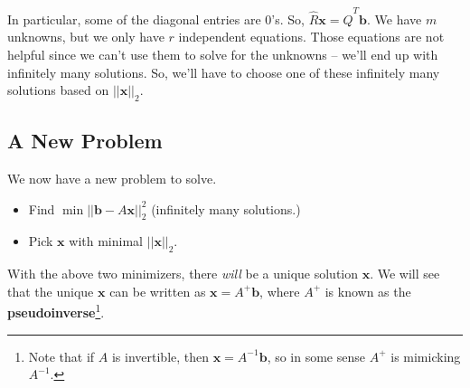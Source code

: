 \documentclass[letterpaper]{article}
\newcommand{\0}{\mathbf{0}}
\renewcommand{\b}{\mathbf{b}}
\newcommand{\x}{\mathbf{x}}
\begin{document}
In particular, some of the diagonal entries are 0's. So, $\hat{R}\x = \hat{Q}^T \b$. We have $m$ unknowns, but we only have $r$ independent equations. Those equations are not helpful since we can't use them to solve for the unknowns -- we'll end up with infinitely many solutions. So, we'll have to choose one of these infinitely many solutions based on $||\x||_2$. 

\subsection{A New Problem}
We now have a new problem to solve. 
\begin{itemize}
    \item Find $\min||\b - A\x||_2^2$ (infinitely many solutions.)
    \item Pick $\x$ with minimal $||\x||_2$. 
\end{itemize}
With the above two minimizers, there \emph{will} be a unique solution $\x$. We will see that the unique $\x$ can be written as $\x = A^+ \b$, where $A^+$ is known as the \textbf{pseudoinverse}\footnote{Note that if $A$ is invertible, then $\x = A^{-1}\b$, so in some sense $A^+$ is mimicking $A^{-1}$.}.

\bigskip 
\end{document}
